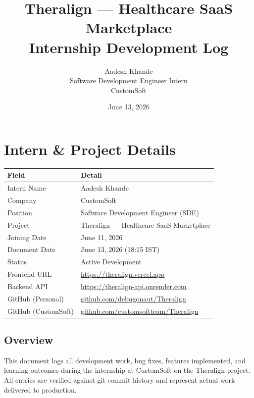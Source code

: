 \documentclass[11pt,a4paper]{article}
\title{\textbf{Theralign — Healthcare SaaS Marketplace}\\Internship Development Log}
\author{Aadesh Khande \\ Software Development Engineer Intern \\ CustomSoft}
\date{June 13, 2026}
\begin{document}
\maketitle
\tableofcontents
\newpage

\section{Intern \& Project Details}

\begin{table}[h!]
\centering
\begin{tabularx}{\textwidth}{l X}
\toprule
\textbf{Field} & \textbf{Detail} \\
\midrule
Intern Name     & Aadesh Khande \\
Company         & CustomSoft \\
Position        & Software Development Engineer (SDE) \\
Project         & Theralign — Healthcare SaaS Marketplace \\
Joining Date    & June 11, 2026 \\
Document Date   & June 13, 2026 (18:15 IST) \\
Status          & Active Development \\
Frontend URL    & \href{https://theralign.vercel.app}{https://theralign.vercel.app} \\
Backend API     & \href{https://theralign-api.onrender.com}{https://theralign-api.onrender.com} \\
GitHub (Personal)   & \href{https://github.com/debugonaut/Theralign}{github.com/debugonaut/Theralign} \\
GitHub (CustomSoft) & \href{https://github.com/customsoftteam/Theralign}{github.com/customsoftteam/Theralign} \\
\bottomrule
\end{tabularx}
\end{table}

\subsection*{Overview}

This document logs all development work, bug fixes, features implemented, and
learning outcomes during the internship at CustomSoft on the Theralign project.
All entries are verified against git commit history and represent actual work
delivered to production.
\end{document}

